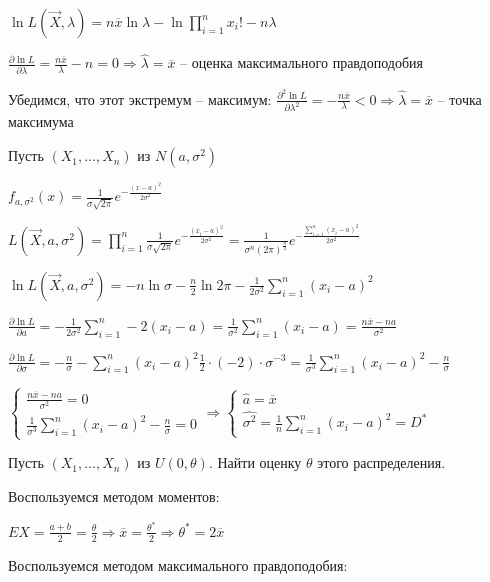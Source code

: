 $\ln L(\vec{X}, \lambda) = n \overline{x} \ln \lambda - \ln \prod_{i = 1}^n x_i! - n\lambda$

$\frac{\partial \ln L}{\partial \lambda} = \frac{n \overline{x}}{\lambda} - n = 0 \Longrightarrow \hat{\lambda} = \overline{x}$ -- оценка максимального правдоподобия

Убедимся, что этот экстремум -- максимум: $\frac{\partial^2 \ln L}{\partial \lambda^2} = -\frac{n \overline{x}}{\lambda} < 0 \Longrightarrow \hat{\lambda} = \overline{x}$ -- точка максимума

 Пусть $(X_1, \dots, X_n)$ из $N(a, \sigma^2)$

$f_{a, \sigma^2} (x) = \frac{1}{\sigma \sqrt{2\pi}} e^{-\frac{(x - a)^2}{2\sigma^2}}$

$L(\vec{X}, a, \sigma^2) = \prod_{i = 1}^n \frac{1}{\sigma \sqrt{2\pi}} e^{-\frac{(x_i - a)^2}{2\sigma^2}} = 
\frac{1}{\sigma^n (2\pi)^{\frac{n}{2}}} e^{-\frac{\sum_{i = 1}^n (x_i - a)^2}{2\sigma^2}}$

$\ln L(\vec{X}, a, \sigma^2) = -n\ln \sigma - \frac{n}{2} \ln 2\pi - \frac{1}{2\sigma^2}\sum_{i = 1}^n (x_i - a)^2$

$\frac{\partial \ln L}{\partial a} = -\frac{1}{2\sigma^2} \sum_{i = 1}^n -2(x_i - a) = \frac{1}{\sigma^2} \sum_{i = 1}^n (x_i - a) = \frac{n\overline{x} - na}{\sigma^2}$

$\frac{\partial \ln L}{\partial \sigma} = -\frac{n}{\sigma} - \sum_{i = 1}^n (x_i - a)^2 \frac{1}{2} \cdot (-2) \cdot \sigma^{-3} = \frac{1}{\sigma^3} \sum_{i = 1}^n (x_i - a)^2 - \frac{n}{\sigma}$

$\begin{cases}
    \frac{n\overline{x} - na}{\sigma^2} = 0 \\
    \frac{1}{\sigma^3} \sum_{i = 1}^n (x_i - a)^2 - \frac{n}{\sigma} = 0
\end{cases} \Longrightarrow \begin{cases}
    \hat{a} = \overline{x} \\
    \widehat{\sigma^2} = \frac{1}{n} \sum_{i = 1}^n (x_i - a)^2 = D^*
\end{cases} $

 Пусть $(X_1, \dots, X_n)$ из $U(0, \theta)$. Найти оценку $\theta$ этого распределения.

Воспользуемся методом моментов:

$EX = \frac{a + b}{2} = \frac{\theta}{2} \Longrightarrow \overline{x} = \frac{\theta^*}{2} \Longrightarrow \theta^* = 2\overline{x}$

Воспользуемся методом максимального правдоподобия:

